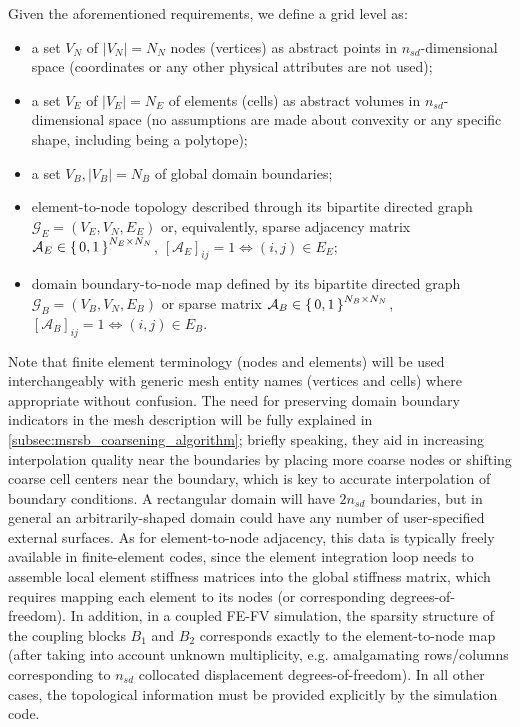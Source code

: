 Given the aforementioned requirements, we define a grid level as:
\begin{itemize}
    \item a set $V_N$ of $|V_N| = N_N$ nodes (vertices) as abstract points in $n_{sd}$-dimensional space (coordinates or any other physical attributes are not used);
    \item a set $V_E$ of $|V_E| = N_E$ of elements (cells) as abstract volumes in $n_{sd}$-dimensional space (no assumptions are made about convexity or any specific shape, including being a polytope);
    \item a set $V_B, |V_B| = N_B$ of global domain boundaries;
    \item element-to-node topology described through its bipartite directed graph $\mathcal{G}_E = (V_E,V_N,E_E)$ or, equivalently, sparse adjacency matrix $\mathcal{A}_{E} \in \set{0,1}^{N_E \times N_N}$, $[\mathcal{A}_E]_{ij} = 1 \Leftrightarrow (i,j) \in E_E$;
    \item domain boundary-to-node map defined by its bipartite directed graph $\mathcal{G}_B = (V_B,V_N,E_B)$ or sparse matrix $\mathcal{A}_{B} \in \set{0,1}^{N_B \times N_N}$, $[\mathcal{A}_B]_{ij} = 1 \Leftrightarrow (i,j) \in E_B$.
\end{itemize}
Note that finite element terminology (nodes and elements) will be used interchangeably with generic mesh entity names (vertices and cells) where appropriate without confusion.   The need for preserving domain boundary indicators in the mesh description will be fully explained in \autoref{subsec:msrsb_coarsening_algorithm}; briefly speaking, they aid in increasing interpolation quality near the boundaries by placing more coarse nodes or shifting coarse cell centers near the boundary, which is key to accurate interpolation of boundary conditions.   A rectangular domain will have $2n_{sd}$ boundaries, but in general an arbitrarily-shaped domain could have any number of user-specified external surfaces.   As for element-to-node adjacency, this data is typically freely available in finite-element codes, since the element integration loop needs to assemble local element stiffness matrices into the global stiffness matrix, which requires mapping each element to its nodes (or corresponding degrees-of-freedom).   In addition, in a coupled FE-FV simulation, the sparsity structure of the coupling blocks $B_1$ and $B_2$ corresponds exactly to the element-to-node map (after taking into account unknown multiplicity, e.g. amalgamating rows/columns corresponding to $n_{sd}$ collocated displacement degrees-of-freedom).   In all other cases, the topological information must be provided explicitly by the simulation code.


